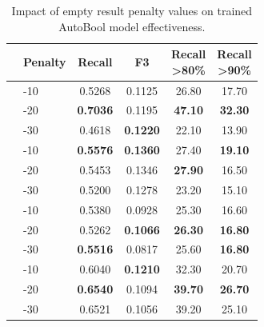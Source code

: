 
\begin{table}[t]
	\small
	\centering
	\caption{Impact of empty result penalty values on trained AutoBool model effectiveness.}
	\label{tab:eval-results-min-reward}

		\begin{tabular}{llcccc}
			\toprule
			& Penalty & Recall & F3 & \parbox{2.5em}{Recall\\>80\%}  & \parbox{2.5em}{Recall\\>90\%} \\
			\midrule
			 & -10 & 0.5268 & 0.1125 & 26.80 & 17.70 \\
			& -20 & \textbf{0.7036} & 0.1195 & \textbf{47.10} & \textbf{32.30} \\
			& -30 & 0.4618 & \textbf{0.1220} & 22.10 & 13.90 \\
			\midrule
			 & -10 & \textbf{0.5576} & \textbf{0.1360} & 27.40 & \textbf{19.10} \\
			& -20 & 0.5453 & 0.1346 & \textbf{27.90} & 16.50 \\
			& -30 & 0.5200 & 0.1278 & 23.20 & 15.10 \\
			\midrule
			 & -10 & 0.5380 & 0.0928 & 25.30 & 16.60 \\
			& -20 & 0.5262 & \textbf{0.1066} & \textbf{26.30} & \textbf{16.80} \\
			& -30 & \textbf{0.5516} & 0.0817 & 25.60 & \textbf{16.80} \\
			\midrule
			 & -10 & 0.6040 & \textbf{0.1210} & 32.30 & 20.70 \\
			& -20 & \textbf{0.6540} & 0.1094 & \textbf{39.70} & \textbf{26.70} \\
			& -30 & 0.6521 & 0.1056 & 39.20 & 25.10 \\
			\bottomrule
		\end{tabular}
	
\end{table}


